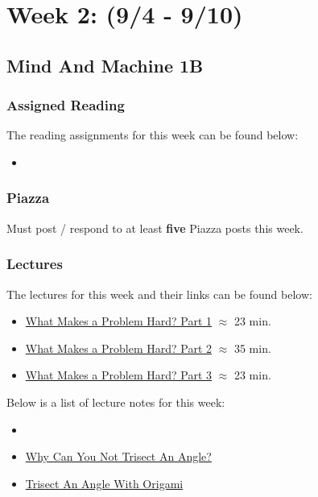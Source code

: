 \clearpage
\chapter{Week 2: (9/4 - 9/10)}

\section{Mind And Machine 1B}

\subsection{Assigned Reading}

The reading assignments for this week can be found below:

\begin{itemize}
    \item {}
\end{itemize}

\subsection{Piazza}

Must post / respond to at least \textbf{five} Piazza posts this week.  

\subsection{Lectures}

The lectures for this week and their links can be found below:

\begin{itemize}
    \item \href{https://applied.cs.colorado.edu/mod/hvp/view.php?id=49327}{What Makes a Problem Hard? Part 1} $\approx$ 23 min.
    \item \href{https://applied.cs.colorado.edu/mod/hvp/view.php?id=49328}{What Makes a Problem Hard? Part 2} $\approx$ 35 min.
    \item \href{https://applied.cs.colorado.edu/mod/hvp/view.php?id=49329}{What Makes a Problem Hard? Part 3} $\approx$ 23 min.
\end{itemize}

\noindent Below is a list of lecture notes for this week:

\begin{itemize}
    \item {}
    \item \href{https://www.youtube.com/watch?v=6Lm9EHhbJAY}{Why Can You Not Trisect An Angle?}
    \item \href{https://www.youtube.com/watch?v=SL2lYcggGpc}{Trisect An Angle With Origami}
\end{itemize}

